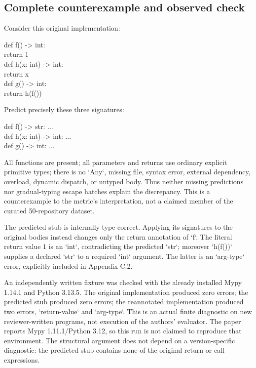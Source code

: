 \documentclass[10pt]{article}
\begin{document}
\subsection*{Complete counterexample and observed check}
Consider this original implementation:\par
{\ttfamily\footnotesize def f() -> int:\\
    return 1\\
def h(x: int) -> int:\\
    return x\\
def g() -> int:\\
    return h(f())}\par
Predict precisely these three signatures:\par
{\ttfamily\footnotesize def f() -> str: ...\\
def h(x: int) -> int: ...\\
def g() -> int: ...}\par
All functions are present; all parameters and returns use ordinary explicit primitive types; there is no `Any`, missing file, syntax error, external dependency, overload, dynamic dispatch, or untyped body. Thus neither missing predictions nor gradual-typing escape hatches explain the discrepancy. This is a counterexample to the metric’s interpretation, not a claimed member of the curated 50-repository dataset.\par
The predicted stub is internally type-correct. Applying its signatures to the original bodies instead changes only the return annotation of `f`. The literal return value \(1\) is an `int`, contradicting the predicted `str`; moreover `h(f())` supplies a declared `str` to a required `int` argument. The latter is an `arg-type` error, explicitly included in Appendix C.2.\par
An independently written fixture was checked with the already installed Mypy 1.14.1 and Python 3.13.5. The original implementation produced zero errors; the predicted stub produced zero errors; the reannotated implementation produced two errors, `return-value` and `arg-type`. This is an actual finite diagnostic on new reviewer-written programs, not execution of the authors’ evaluator. The paper reports Mypy 1.11.1/Python 3.12, so this run is not claimed to reproduce that environment. The structural argument does not depend on a version-specific diagnostic: the predicted stub contains none of the original return or call expressions.\par
\end{document}
